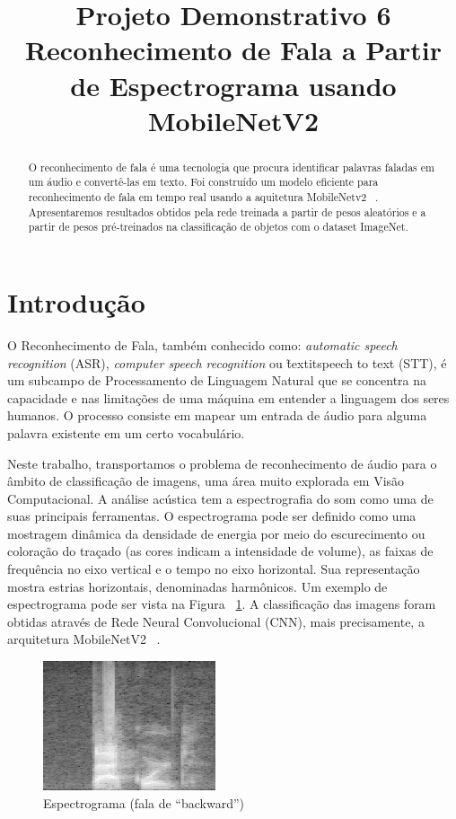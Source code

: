 \documentclass{bmvc2k}
\title{Projeto Demonstrativo 6\\ Reconhecimento de Fala a Partir de Espectrograma usando MobileNetV2}
\begin{document}
\maketitle

\begin{abstract}

O reconhecimento de fala é uma tecnologia que procura identificar palavras faladas em um áudio e convertê-las em texto. Foi construído um modelo eficiente para reconhecimento de fala em tempo real usando a aquitetura MobileNetv2 ~\cite{mobilenets}. Apresentaremos resultados obtidos pela rede treinada a partir de pesos aleatórios e a partir de pesos pré-treinados na classificação de objetos com o dataset ImageNet.

\end{abstract}

\section{Introdução}
\label{sec:intro}

O Reconhecimento de Fala, também conhecido como: \textit{automatic speech recognition} (ASR), \textit{computer speech recognition} ou \~textit{speech to text} (STT), é um subcampo de Processamento de Linguagem Natural que se concentra na capacidade e nas limitações de uma máquina em entender a linguagem dos seres humanos. O processo consiste em mapear um entrada de áudio para alguma palavra existente em um certo vocabulário. 

Neste trabalho, transportamos o problema de reconhecimento de áudio para o âmbito de classificação de imagens, uma área muito explorada em Visão Computacional. A análise acústica tem a espectrografia do som como uma de suas principais ferramentas. O espectrograma pode ser definido como uma mostragem dinâmica da densidade de energia por meio do escurecimento ou coloração do traçado (as cores indicam a intensidade de volume), as faixas de frequência no eixo vertical e o tempo no eixo horizontal. Sua representação mostra estrias horizontais, denominadas harmônicos. Um exemplo de espectrograma pode ser vista na Figura ~\ref{espc}. A classificação das imagens foram obtidas através de Rede Neural Convolucional (CNN), mais precisamente, a arquitetura MobileNetV2 ~\cite{mobilenets}.

\begin{figure}[htbp]
\centering
\includegraphics[scale=0.4]{imagens/spect.png} 
\caption{Espectrograma (fala de ``backward'')}
\label{espc}
\end{figure}
\end{document}
